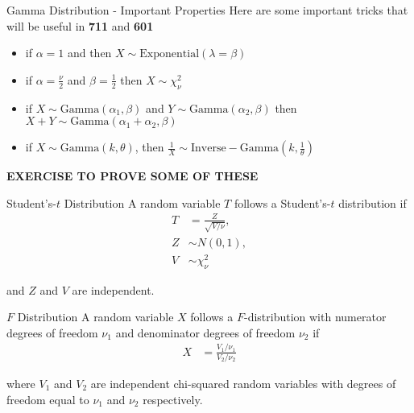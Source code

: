\documentclass{beamer}
\begin{document}
\begin{frame}{Gamma Distribution  - Important Properties}
Here are some important tricks that will be useful in \textbf{711} and \textbf{601}
\begin{itemize}
\item{if $\alpha = 1$ and then $X\sim\mathrm{Exponential}(\lambda = \beta)$}
\item{if $\alpha = \frac{\nu}{2}$ and $\beta = \frac{1}{2}$ then $X\sim\chi^{2}_{\nu}$}
\item{if $X\sim\mathrm{Gamma}(\alpha_{1}, \beta)$ and $Y\sim\mathrm{Gamma}(\alpha_{2}, \beta)$ then $X+Y\sim\mathrm{Gamma}(\alpha_{1}+\alpha_{2}, \beta)$}
\item{if $X\sim\mathrm{Gamma}(k, \theta)$, then $\frac{1}{X}\sim\mathrm{Inverse-Gamma}(k, \frac{1}{\theta})$}
\end{itemize}

\textbf{EXERCISE TO PROVE SOME OF THESE}

\end{frame}

\begin{frame}{Student's-$t$ Distribution}
A random variable $T$ follows a Student's-$t$ distribution if
\begin{align*}
T & = \frac{Z}{\sqrt{V/\nu}},\\
Z &\sim N(0, 1),\\
V &\sim \chi^2_{\nu}
\end{align*} 

and $Z$ and $V$ are independent.
\end{frame}

\begin{frame}{$F$ Distribution}
A random variable $X$ follows a $F$-distribution with numerator degrees of freedom $\nu_1$ and denominator degrees of freedom $\nu_2$ if
\begin{align*}
X &= \frac{V_1 / \nu_1}{V_2 / \nu_2}
\end{align*} 

where $V_1$ and $V_2$ are independent chi-squared random variables with degrees of freedom equal to $\nu_1$ and $\nu_2$ respectively.
\end{frame}
\end{document}

